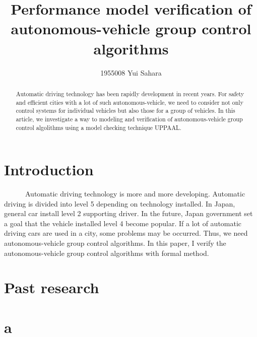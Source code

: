\documentclass[]{article}
\title{Performance model verification of autonomous-vehicle group control algorithms}
\author{1955008	Yui Sahara}
\date{}
\begin{document}
\maketitle
\begin{abstract}
Automatic driving technology has been rapidly development in recent years.  For safety and efficient cities with a lot of such autonomous-vehicle, we need to consider not only control systems for individual vehicles but also those for a group of vehicles.  In this article, we investigate a way to modeling and verification of autonomous-vehicle group control algolithms using a model checking technique UPPAAL.
\end{abstract}

\section{Introduction}
　　　Automatic driving technology is more and more developing.  Automatic driving is divided into level  5 depending on technology installed.  In Japan, general car install level 2 supporting driver.  In the future,  Japan government set a goal that the vehicle installed level 4 become popular.  If a lot of automatic driving cars are used in a city, some problems may be occurred.  Thus, we need autonomous-vehicle group control algorithms.  In this paper, I verify the autonomous-vehicle group control algorithms with formal method.
\section{Past research}
	
\section{a}
\begin{thebibliography}{1}
\end{thebibliography}
\end{document}
